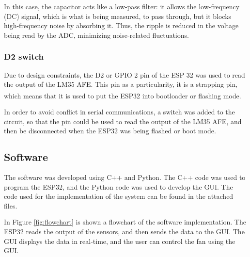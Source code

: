 \documentclass[12pt]{article}
\begin{document}
In this case, the capacitor acts like a low-pass filter: it allows the low-frequency (DC) signal, which is what is being measured, to pass through, but it blocks high-frequency noise by absorbing it. Thus, the ripple is reduced in the voltage being read by the ADC, minimizing noise-related fluctuations.

\subsubsection{D2 switch}
Due to design constraints, the D2 or GPIO 2 pin of the ESP 32 was used to read the output of the LM35 AFE. This pin as a particularity, it is a strapping pin, which means that it is used to put the ESP32 into bootloader or flashing mode\textsuperscript{\cite{ESP-IDF-Programming-Guide}}.

In order to avoid conflict in serial communications, a switch was added to the circuit, so that the pin could be used to read the output of the LM35 AFE, and then be disconnected when the ESP32 was being flashed or boot mode. 

\subsection{Software}
The software was developed using C++ and Python. The C++ code was used to program the ESP32, and the Python code was used to develop the GUI. The code used for the implementation of the system can be found in the attached files.

In Figure \ref{fig:flowchart} is shown a flowchart of the software implementation. The ESP32 reads the output of the sensors, and then sends the data to the GUI. The GUI displays the data in real-time, and the user can control the fan using the GUI.
\end{document}
